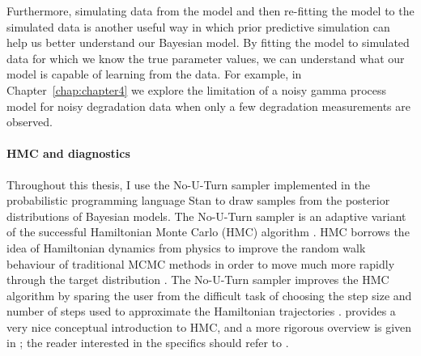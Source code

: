 Furthermore, simulating data from the model and then re-fitting the model to the simulated data is another useful way in which prior predictive simulation can help us better understand our Bayesian model. By fitting the model to simulated data for which we know the true parameter values, we can understand what our model is capable of learning from the data. For example, in Chapter~\ref{chap:chapter4} we explore the limitation of a noisy gamma process model for noisy degradation data when only a few degradation measurements are observed.

\paragraph*{HMC and diagnostics}

Throughout this thesis, I use the No-U-Turn sampler \citep{hoffman_2014} implemented in the probabilistic programming language Stan \citep{Stan2022} to draw samples from the posterior distributions of Bayesian models. The No-U-Turn sampler is an adaptive variant of the successful Hamiltonian Monte Carlo (HMC) algorithm \citep{neal2011}. HMC borrows the idea of Hamiltonian dynamics from physics to improve the random walk behaviour of traditional MCMC methods in order to move much more rapidly through the target distribution \citep{BDA2020}. The No-U-Turn sampler improves the HMC algorithm by sparing the user from the difficult task of choosing the step size and number of steps used to approximate the Hamiltonian trajectories \citep{hoffman_2014}. \citet{betancourt_2017} provides a very nice conceptual introduction to HMC, and a more rigorous overview is given in \citet[p.~300]{BDA2020}; the reader interested in the specifics should refer to \citet{betancourt_2015}.

